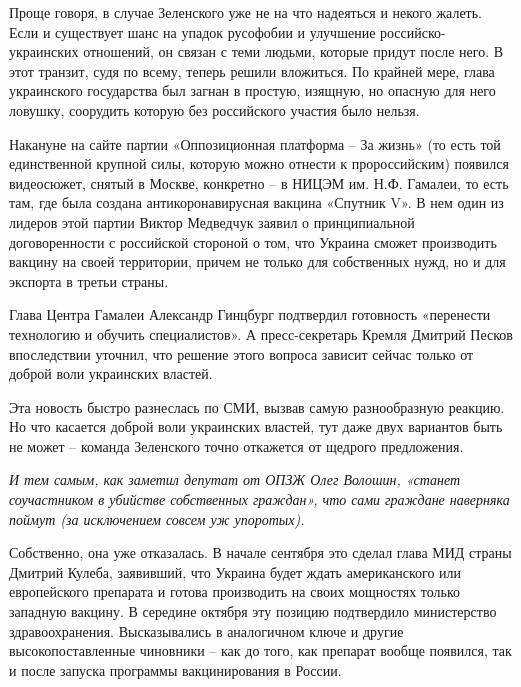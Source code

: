 Проще говоря, в случае Зеленского уже не на что надеяться и некого жалеть. Если
и существует шанс на упадок русофобии и улучшение российско-украинских
отношений, он связан с теми людьми, которые придут после него. В этот транзит,
судя по всему, теперь решили вложиться. По крайней мере, глава украинского
государства был загнан в простую, изящную, но опасную для него ловушку,
соорудить которую без российского участия было нельзя. 

Накануне на сайте партии «Оппозиционная платформа – За жизнь» (то есть той
единственной крупной силы, которую можно отнести к пророссийским) появился
видеосюжет, снятый в Москве, конкретно – в НИЦЭМ им. Н.Ф. Гамалеи, то есть там,
где была создана антикоронавирусная вакцина «Спутник V». В нем один из лидеров
этой партии Виктор Медведчук заявил о принципиальной договоренности с
российской стороной о том, что Украина сможет производить вакцину на своей
территории, причем не только для собственных нужд, но и для экспорта в третьи
страны.

Глава Центра Гамалеи Александр Гинцбург подтвердил готовность «перенести
технологию и обучить специалистов». А пресс-секретарь Кремля Дмитрий Песков
впоследствии уточнил, что решение этого вопроса зависит сейчас только от доброй
воли украинских властей.

Эта новость быстро разнеслась по СМИ, вызвав самую разнообразную реакцию. Но
что касается доброй воли украинских властей, тут даже двух вариантов быть не
может – команда Зеленского точно откажется от щедрого предложения. 

\begin{leftbar}
	\begingroup
		\em
			И тем самым, как заметил депутат от ОПЗЖ Олег Волошин, «станет
				соучастником в убийстве собственных граждан», что сами граждане
				наверняка поймут (за исключением совсем уж упоротых). 
	\endgroup
\end{leftbar}

Собственно, она уже отказалась. В начале сентября это сделал глава МИД страны
Дмитрий Кулеба, заявивший, что Украина будет ждать американского или
европейского препарата и готова производить на своих мощностях только западную
вакцину. В середине октября эту позицию подтвердило министерство
здравоохранения. Высказывались в аналогичном ключе и другие высокопоставленные
чиновники – как до того, как препарат вообще появился, так и после запуска
программы вакцинирования в России.

